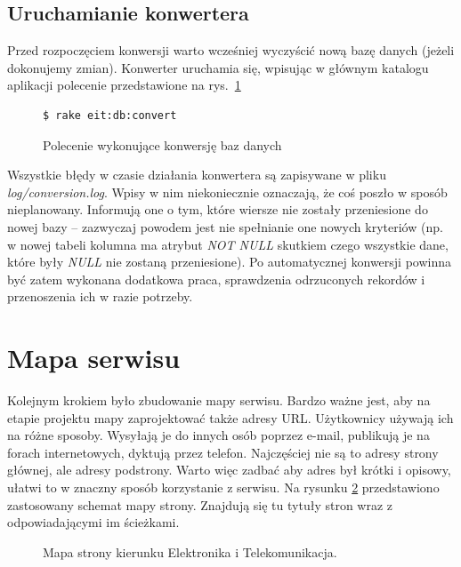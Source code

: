 \documentclass[a4paper,12pt,oneside]{report}
\begin{document}
\subsection{Uruchamianie konwertera}
\label{sub:conv-run}

Przed rozpoczęciem konwersji warto wcześniej wyczyścić nową bazę danych (jeżeli dokonujemy zmian). Konwerter uruchamia się, wpisując w głównym katalogu aplikacji polecenie przedstawione na rys.~\ref{fig:raketask}
\begin{figure}
\centering
\begin{verbatim}$ rake eit:db:convert\end{verbatim}
\caption{Polecenie wykonujące konwersję baz danych\label{fig:raketask}}
\end{figure}
Wszystkie błędy w czasie działania konwertera są zapisywane w pliku \emph{log/conversion.log}. Wpisy w nim niekoniecznie oznaczają, że coś poszło w sposób nieplanowany. Informują one o tym, które wiersze nie zostały przeniesione do nowej bazy -- zazwyczaj powodem jest nie spełnianie one nowych kryteriów (np. w nowej tabeli kolumna ma atrybut \emph{NOT NULL} skutkiem czego wszystkie dane, które były \emph{NULL} nie zostaną przeniesione). Po automatycznej konwersji powinna być zatem wykonana dodatkowa praca, sprawdzenia odrzuconych rekordów i przenoszenia ich w razie potrzeby.

\section{Mapa serwisu}
\label{sec:mapa}
Kolejnym krokiem było zbudowanie mapy serwisu. Bardzo ważne jest, aby na etapie projektu mapy zaprojektować także adresy URL. Użytkownicy używają ich na różne sposoby. Wysyłają je do innych osób poprzez e-mail, publikują je na forach internetowych, dyktują przez telefon. Najczęściej nie są to adresy strony głównej, ale adresy podstrony. Warto więc zadbać aby adres był krótki i opisowy, ułatwi to w znaczny sposób korzystanie z serwisu. Na rysunku \ref{fig:eitmap} przedstawiono zastosowany schemat mapy strony. Znajdują się tu tytuły stron wraz z odpowiadającymi im ścieżkami.

\newpage
\thispagestyle{empty}
\addtolength{\textwidth}{4cm}
\addtolength{\hoffset}{-2.5cm}
\addtolength{\textheight}{5cm}
\addtolength{\voffset}{-3.5cm}
\begin{landscape}
\begin{figure}
\centering
  \caption{
  Mapa strony kierunku Elektronika i Telekomunikacja.
  \label{fig:eitmap}
  }
\end{figure}
\end{landscape}
\newpage
\addtolength{\textwidth}{-4cm}
\addtolength{\hoffset}{2.5cm}
\addtolength{\textheight}{-5cm}
\addtolength{\voffset}{3.5cm}
\end{document}
